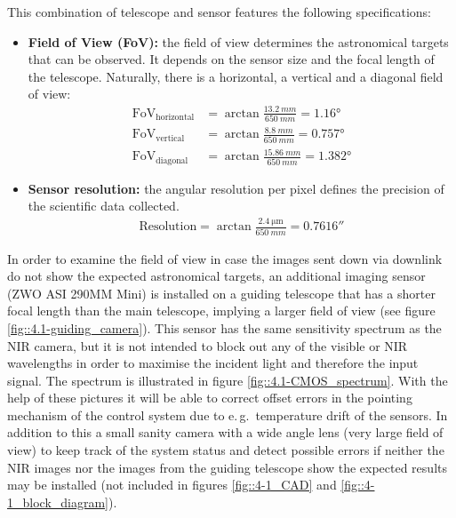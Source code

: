 This combination of telescope and sensor features the following specifications:

\begin{itemize}
	\item \textbf{Field of View (FoV):} the field of view determines the astronomical targets that can be observed. It depends on the sensor size and the focal length of the telescope. Naturally, there is a horizontal, a vertical and a diagonal field of view:
	\begin{align}
		\text{FoV}_\text{horizontal} &= \arctan \frac{\SI{13.2}{mm}}{\SI{650}{mm}} = \ang{1,16} \\
		\text{FoV}_\text{vertical} &= \arctan \frac{\SI{8.8}{mm}}{\SI{650}{mm}} = \ang{0,757} \\
		\text{FoV}_\text{diagonal} &= \arctan \frac{\SI{15,86}{mm}}{\SI{650}{mm}} = \ang{1,382}
	\end{align}
	\item \textbf{Sensor resolution:} the angular resolution per pixel defines the precision of the scientific data collected.
	\begin{align}
		\text{Resolution} = \arctan \frac{\SI{2,4}{\um}}{\SI{650}{mm}} %
		 = \ang{;;0,7616}
	\end{align}
\end{itemize}

In order to examine the field of view in case the images sent down via downlink do not show the expected astronomical targets, an additional imaging sensor (ZWO ASI 290MM Mini) is installed on a guiding telescope that has a shorter focal length than the main telescope, implying a larger field of view (see figure \ref{fig::4.1-guiding_camera}). This sensor has the same sensitivity spectrum as the NIR camera, but it is not intended to block out any of the visible or NIR wavelengths in order to maximise the incident light and therefore the input signal. The spectrum is illustrated in figure \ref{fig::4.1-CMOS_spectrum}. With the help of these pictures it will be able to correct offset errors in the pointing mechanism of the control system due to e.\,g.~temperature drift of the sensors. In addition to this a small sanity camera with a wide angle lens (very large field of view) to keep track of the system status and detect possible errors if neither the NIR images nor the images from the guiding telescope show the expected results may be installed (not included in figures \ref{fig::4-1_CAD} and \ref{fig::4-1_block_diagram}).



